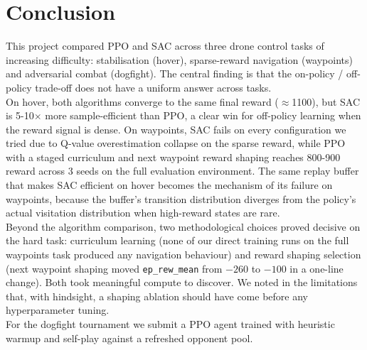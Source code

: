 \documentclass[11pt,a4paper]{article}
\begin{document}
\section{Conclusion}

This project compared PPO and SAC across three drone control tasks of increasing
difficulty: stabilisation (hover), sparse-reward navigation (waypoints) and
adversarial combat (dogfight). The central finding is that the on-policy / off-policy
trade-off does not have a uniform answer across tasks. \\

On hover, both algorithms converge to the same final reward
($\approx$1100), but SAC is 5-10$\times$ more sample-efficient than PPO, a clear
win for off-policy learning when the reward signal is dense. On waypoints, SAC fails on every configuration we tried due to Q-value overestimation
collapse on the sparse reward, while PPO with a staged curriculum and next waypoint
reward shaping reaches 800-900 reward across 3 seeds on the full evaluation
environment. The same replay buffer that makes SAC efficient on hover becomes the
mechanism of its failure on waypoints, because the buffer's transition distribution
diverges from the policy's actual visitation distribution when high-reward states are
rare. \\

Beyond the algorithm comparison, two methodological choices proved decisive on the
hard task: curriculum learning (none of our direct training runs on the
full waypoints task produced any navigation behaviour) and reward shaping
selection (next waypoint shaping moved \texttt{ep\_rew\_mean} from $-260$ to
$-100$ in a one-line change). Both took meaningful compute to discover. We noted in
the limitations that, with hindsight, a shaping ablation should have come before any
hyperparameter tuning. \\

For the dogfight tournament we submit a PPO agent trained with heuristic warmup and
self-play against a refreshed opponent pool.



\end{document}
